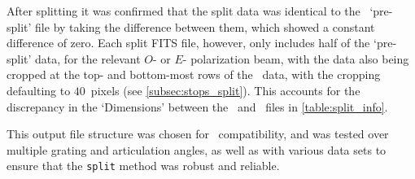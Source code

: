 

After splitting it was confirmed that the split data was identical to the \polsalt\ `pre-split' file by taking the difference between them, which showed a constant difference of zero.
Each split \gls{FITS} file, however, only includes half of the `pre-split' data, for the relevant $O$- or $E$- polarization beam, with the data also being cropped at the top- and bottom-most rows of the \polsalt\ data, with the cropping defaulting to $40$~pixels (see \autoref{subsec:stops_split}).
This accounts for the discrepancy in the `Dimensions' between the \polsalt\ and \stops\ files in \autoref{table:split_info}.

This output file structure was chosen for \iraf\ compatibility, and was tested over multiple grating and articulation angles, as well as with various data sets to ensure that the \texttt{split} method was robust and reliable.

